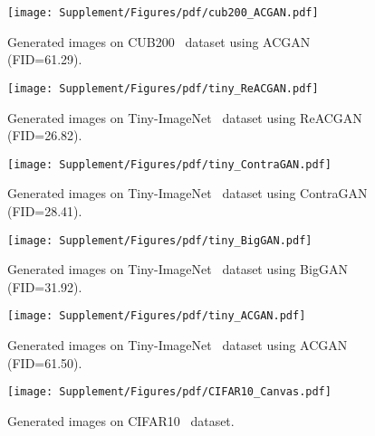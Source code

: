 \documentclass{article}
\begin{document}
\begin{figure}[ht]
    \centering
    \texttt{[image: Supplement/Figures/pdf/cub200\_ACGAN.pdf]}
    \hspace{-0.25cm}
    \caption{Generated images on CUB200~\cite{WelinderEtal2010} dataset using ACGAN~\cite{Odena2017ConditionalIS} (FID=61.29).}
    \label{fig:Figure_qualitative_ac_cub}
\end{figure} 
\begin{figure}[ht]
    \centering
    \texttt{[image: Supplement/Figures/pdf/tiny\_ReACGAN.pdf]}
    \hspace{-0.25cm}
    \caption{Generated images on Tiny-ImageNet~\cite{Tiny} dataset using ReACGAN (FID=26.82).} 
    \label{fig:Figure_qualitative_reac_tiny}
\end{figure} \begin{figure}[ht]
    \centering
    \texttt{[image: Supplement/Figures/pdf/tiny\_ContraGAN.pdf]}
    \hspace{-0.25cm}
    \caption{Generated images on Tiny-ImageNet~\cite{Tiny} dataset using ContraGAN~\cite{kang2020contragan} (FID=28.41).} 
    \label{fig:Figure_qualitative_contra_tiny}
\end{figure} \begin{figure}[ht]
    \centering
    \texttt{[image: Supplement/Figures/pdf/tiny\_BigGAN.pdf]}
    \hspace{-0.25cm}
    \caption{Generated images on Tiny-ImageNet~\cite{Tiny} dataset using BigGAN~\cite{Brock2019LargeSG} (FID=31.92).} 
    \label{fig:Figure_qualitative_big_tiny}
\end{figure} \begin{figure}[ht]
    \centering
    \texttt{[image: Supplement/Figures/pdf/tiny\_ACGAN.pdf]}
    \hspace{-0.25cm}
    \caption{Generated images on Tiny-ImageNet~\cite{Tiny} dataset using ACGAN~\cite{Odena2017ConditionalIS} (FID=61.50).} 
    \label{fig:Figure_qualitative_ac_tiny}
\end{figure} \begin{figure}[ht]
    \centering
    \texttt{[image: Supplement/Figures/pdf/CIFAR10\_Canvas.pdf]}
    \caption{Generated images on CIFAR10~\cite{Krizhevsky2009LearningML} dataset.} 
    \label{fig:Figure_qualitative_cifar}
\end{figure}  \clearpage
\end{document}
